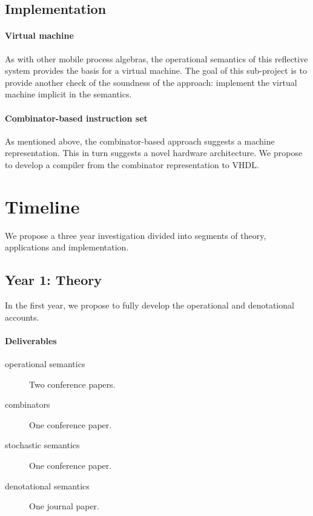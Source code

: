 \documentclass[]{amsart}
\theoremstyle{definition}
\theoremstyle{remark}
\numberwithin{equation}{subsection}
\begin{document}
\subsection{Implementation}

\paragraph{Virtual machine} 

As with other mobile process algebras, the operational semantics of
this reflective system provides the basis for a virtual machine. The
goal of this sub-project is to provide another check of the soundness
of the approach: implement the virtual machine implicit in the
semantics.

\paragraph{Combinator-based instruction set} 

As mentioned above, the combinator-based approach suggests a machine
representation. This in turn suggests a novel hardware
architecture. We propose to develop a compiler from the combinator
representation to VHDL.

\section{Timeline}

We propose a three year investigation divided into segments of theory,
applications and implementation.

\subsection{Year 1: Theory}

In the first year, we propose to fully develop the operational and
denotational accounts. 

\paragraph{Deliverables}

\begin{description}
	\item [operational semantics] Two conference papers.
	\item [combinators] One conference paper.
	\item [stochastic semantics] One conference paper.
	\item [denotational semantics] One journal paper.
\end{description}
\end{document}

